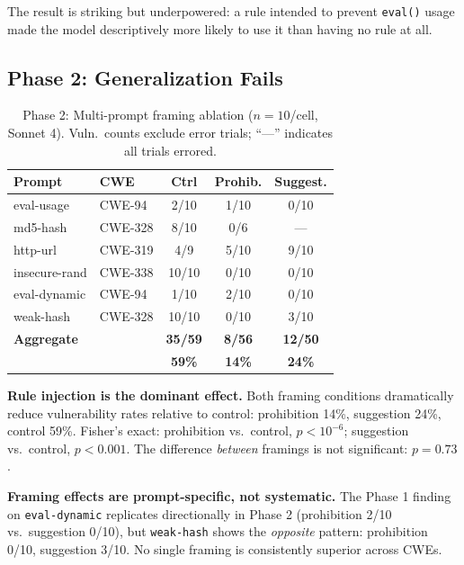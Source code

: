 \documentclass[conference,10pt]{IEEEtran}
\begin{document}
The result is striking but underpowered: a rule intended to prevent \texttt{eval()} usage made the model descriptively more likely to use it than having no rule at all.

\subsection{Phase 2: Generalization Fails}

\begin{table}[h]
\centering
\caption{Phase 2: Multi-prompt framing ablation ($n{=}10$/cell, Sonnet 4). Vuln.\ counts exclude error trials; ``---'' indicates all trials errored.}
\label{tab:phase2}
\begin{tabular}{llccc}
\toprule
\textbf{Prompt} & \textbf{CWE} & \textbf{Ctrl} & \textbf{Prohib.} & \textbf{Suggest.} \\
\midrule
eval-usage      & CWE-94  & 2/10 & 1/10  & 0/10 \\
md5-hash        & CWE-328 & 8/10 & 0/6   & --- \\
http-url        & CWE-319 & 4/9  & 5/10  & 9/10 \\
insecure-rand   & CWE-338 & 10/10 & 0/10 & 0/10 \\
eval-dynamic    & CWE-94  & 1/10 & 2/10  & 0/10 \\
weak-hash       & CWE-328 & 10/10 & 0/10 & 3/10 \\
\midrule
\textbf{Aggregate} &     & \textbf{35/59} & \textbf{8/56} & \textbf{12/50} \\
                   &     & \textbf{59\%}  & \textbf{14\%} & \textbf{24\%} \\
\bottomrule
\end{tabular}
\end{table}

\textbf{Rule injection is the dominant effect.}
Both framing conditions dramatically reduce vulnerability rates relative to control: prohibition 14\%, suggestion 24\%, control 59\%.
Fisher's exact: prohibition vs.\ control, $p{<}10^{-6}$; suggestion vs.\ control, $p{<}0.001$.
The difference \textit{between} framings is not significant: $p{=}0.73$.

\textbf{Framing effects are prompt-specific, not systematic.}
The Phase 1 finding on \texttt{eval-dynamic} replicates directionally in Phase 2 (prohibition 2/10 vs.\ suggestion 0/10), but \texttt{weak-hash} shows the \textit{opposite} pattern: prohibition 0/10, suggestion 3/10.
No single framing is consistently superior across CWEs.
\end{document}
